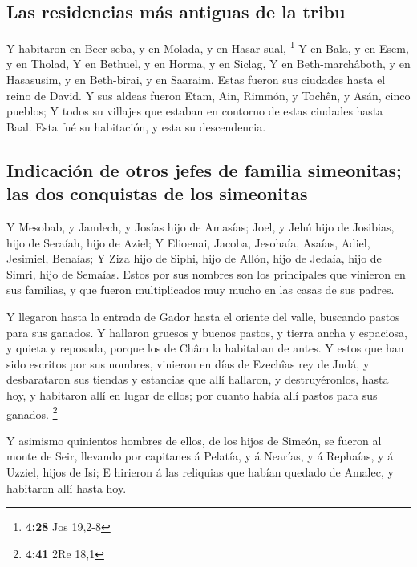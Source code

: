 \hypertarget{las-residencias-muxe1s-antiguas-de-la-tribu}{%
\subsection{Las residencias más antiguas de la
tribu}\label{las-residencias-muxe1s-antiguas-de-la-tribu}}

 Y habitaron en Beer-seba, y en Molada, y en Hasar-sual,
\footnote{\textbf{4:28} Jos 19,2-8}  Y en Bala, y en Esem,
y en Tholad,  Y en Bethuel, y en Horma, y en Siclag,
 Y en Beth-marchâboth, y en Hasasusim, y en Beth-birai, y
en Saaraim. Estas fueron sus ciudades hasta el reino de David.
 Y sus aldeas fueron Etam, Ain, Rimmón, y Tochên, y Asán,
cinco pueblos;  Y todos su villajes que estaban en contorno
de estas ciudades hasta Baal. Esta fué su habitación, y esta su
descendencia.

\hypertarget{indicaciuxf3n-de-otros-jefes-de-familia-simeonitas-las-dos-conquistas-de-los-simeonitas}{%
\subsection{Indicación de otros jefes de familia simeonitas; las dos
conquistas de los
simeonitas}\label{indicaciuxf3n-de-otros-jefes-de-familia-simeonitas-las-dos-conquistas-de-los-simeonitas}}

 Y Mesobab, y Jamlech, y Josías hijo de Amasías;
 Joel, y Jehú hijo de Josibias, hijo de Seraíah, hijo de
Aziel;  Y Elioenai, Jacoba, Jesohaía, Asaías, Adiel,
Jesimiel, Benaías;  Y Ziza hijo de Siphi, hijo de Allón,
hijo de Jedaía, hijo de Simri, hijo de Semaías.  Estos por
sus nombres son los principales que vinieron en sus familias, y que
fueron multiplicados muy mucho en las casas de sus padres.

 Y llegaron hasta la entrada de Gador hasta el oriente del
valle, buscando pastos para sus ganados.  Y hallaron
gruesos y buenos pastos, y tierra ancha y espaciosa, y quieta y
reposada, porque los de Châm la habitaban de antes.  Y
estos que han sido escritos por sus nombres, vinieron en días de
Ezechîas rey de Judá, y desbarataron sus tiendas y estancias que allí
hallaron, y destruyéronlos, hasta hoy, y habitaron allí en lugar de
ellos; por cuanto había allí pastos para sus ganados. \footnote{\textbf{4:41}
  2Re 18,1}

 Y asimismo quinientos hombres de ellos, de los hijos de
Simeón, se fueron al monte de Seir, llevando por capitanes á Pelatía, y
á Nearías, y á Rephaías, y á Uzziel, hijos de Isi;  E
hirieron á las reliquias que habían quedado de Amalec, y habitaron allí
hasta hoy.

